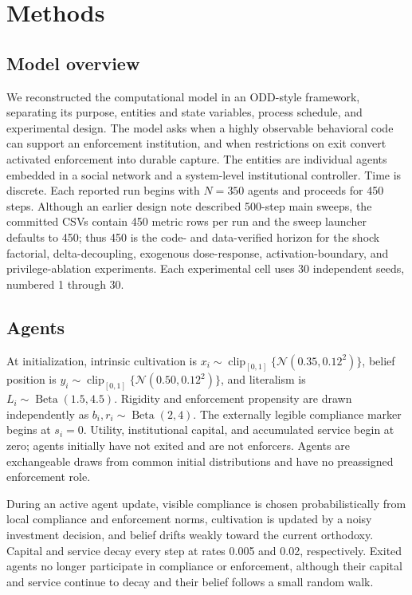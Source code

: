 \documentclass[12pt]{article}
\begin{document}

\section{Methods}

\subsection{Model overview}

We reconstructed the computational model in an ODD-style framework, separating its purpose, entities and state variables, process schedule, and experimental design. The model asks when a highly observable behavioral code can support an enforcement institution, and when restrictions on exit convert activated enforcement into durable capture. The entities are individual agents embedded in a social network and a system-level institutional controller. Time is discrete. Each reported run begins with \(N=350\) agents and proceeds for 450 steps. Although an earlier design note described 500-step main sweeps, the committed CSVs contain 450 metric rows per run and the sweep launcher defaults to 450; thus 450 is the code- and data-verified horizon for the shock factorial, delta-decoupling, exogenous dose-response, activation-boundary, and privilege-ablation experiments. Each experimental cell uses 30 independent seeds, numbered 1 through 30.

\subsection{Agents}

At initialization, intrinsic cultivation is \(x_i\sim\operatorname{clip}_{[0,1]}\{\mathcal{N}(0.35,0.12^2)\}\), belief position is \(y_i\sim\operatorname{clip}_{[0,1]}\{\mathcal{N}(0.50,0.12^2)\}\), and literalism is \(L_i\sim\operatorname{Beta}(1.5,4.5)\). Rigidity and enforcement propensity are drawn independently as \(b_i,r_i\sim\operatorname{Beta}(2,4)\). The externally legible compliance marker begins at \(s_i=0\). Utility, institutional capital, and accumulated service begin at zero; agents initially have not exited and are not enforcers. Agents are exchangeable draws from common initial distributions and have no preassigned enforcement role.

During an active agent update, visible compliance is chosen probabilistically from local compliance and enforcement norms, cultivation is updated by a noisy investment decision, and belief drifts weakly toward the current orthodoxy. Capital and service decay every step at rates 0.005 and 0.02, respectively. Exited agents no longer participate in compliance or enforcement, although their capital and service continue to decay and their belief follows a small random walk.
\end{document}
